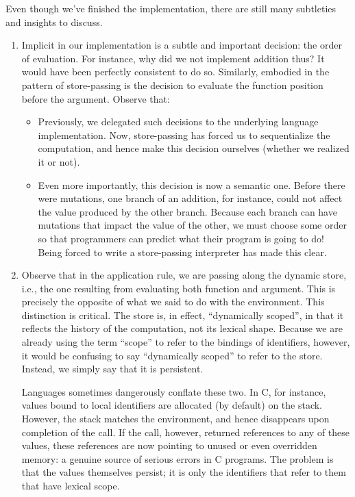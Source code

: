 
Even though we’ve finished the implementation, there are still many subtleties
and insights to discuss.

\begin{enumerate}
  \item 
Implicit in our implementation is a subtle and important decision: the order of
evaluation. For instance, why did we not implement addition thus?  
It would have been perfectly consistent to do so. Similarly, embodied in the
pattern of store-passing is the decision to evaluate the function position
before the argument. Observe that:
\begin{itemize}
  \item 
Previously, we delegated such decisions to the underlying language
implementation. Now, store-passing has forced us to sequentialize the
computation, and hence make this decision ourselves (whether we realized it or
not).
  \item
Even more importantly, this decision is now a semantic one. Before there were
mutations, one branch of an addition, for instance, could not affect the value
produced by the other branch. Because each branch can have mutations that impact
the value of the other, we must choose some order so that programmers can
predict what their program is going to do! Being forced to write a store-passing
interpreter has made this clear.
\end{itemize}

  \item
Observe that in the application rule, we are passing along the dynamic store,
i.e., the one resulting from evaluating both function and argument. This is
precisely the opposite of what we said to do with the environment. This
distinction is critical. The store is, in effect, “dynamically scoped”, in that
it reflects the history of the computation, not its lexical shape. Because we
are already using the term “scope” to refer to the bindings of identifiers,
however, it would be confusing to say “dynamically scoped” to refer to the
store. Instead, we simply say that it is persistent.

Languages sometimes dangerously conflate these two. In C, for instance, values
bound to local identifiers are allocated (by default) on the stack. However, the
stack matches the environment, and hence disappears upon completion of the call.
If the call, however, returned references to any of these values, these
references are now pointing to unused or even overridden memory: a genuine
source of serious errors in C programs. The problem is that the values
themselves persist; it is only the identifiers that refer to them that have
lexical scope.


\end{enumerate}
